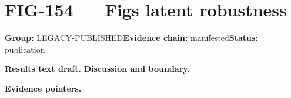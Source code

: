 \clearpage
\section{FIG-154 --- Figs latent robustness}
\label{figpage:fig-154}
\textbf{Group:} LEGACY-PUBLISHED\quad \textbf{Evidence chain:} manifested\quad \textbf{Status:} publication

\textbf{Results text draft.} 
\textbf{Discussion and boundary.} 


\textbf{Evidence pointers.}



\vfill
